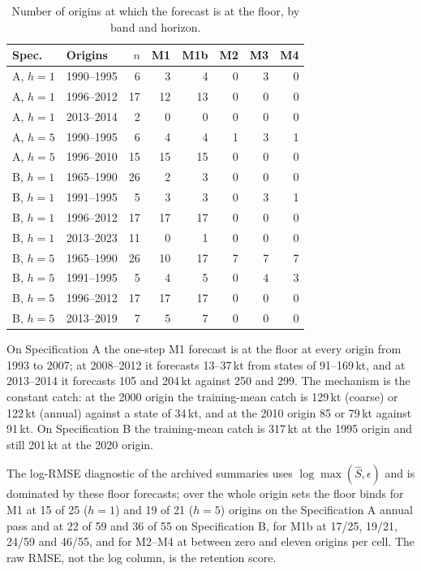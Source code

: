 \documentclass[preprint,11pt,authoryear]{elsarticle}
\theoremstyle{remark}
\begin{document}
\begin{table}[!htb]
\centering\footnotesize\setlength{\tabcolsep}{3.5pt}
\caption{Number of origins at which the forecast is at the floor, by band and horizon.}
\label{tab:si_floor}
\begin{tabular}{@{}llrrrrrr@{}}
\toprule
Spec. & Origins & $n$ & M1 & M1b & M2 & M3 & M4 \\
\midrule
A, $h=1$ & 1990--1995 & 6 & 3 & 4 & 0 & 3 & 0 \\
A, $h=1$ & 1996--2012 & 17 & 12 & 13 & 0 & 0 & 0 \\
A, $h=1$ & 2013--2014 & 2 & 0 & 0 & 0 & 0 & 0 \\
A, $h=5$ & 1990--1995 & 6 & 4 & 4 & 1 & 3 & 1 \\
A, $h=5$ & 1996--2010 & 15 & 15 & 15 & 0 & 0 & 0 \\
B, $h=1$ & 1965--1990 & 26 & 2 & 3 & 0 & 0 & 0 \\
B, $h=1$ & 1991--1995 & 5 & 3 & 3 & 0 & 3 & 1 \\
B, $h=1$ & 1996--2012 & 17 & 17 & 17 & 0 & 0 & 0 \\
B, $h=1$ & 2013--2023 & 11 & 0 & 1 & 0 & 0 & 0 \\
B, $h=5$ & 1965--1990 & 26 & 10 & 17 & 7 & 7 & 7 \\
B, $h=5$ & 1991--1995 & 5 & 4 & 5 & 0 & 4 & 3 \\
B, $h=5$ & 1996--2012 & 17 & 17 & 17 & 0 & 0 & 0 \\
B, $h=5$ & 2013--2019 & 7 & 5 & 7 & 0 & 0 & 0 \\
\bottomrule
\end{tabular}
\end{table}

On Specification A the one-step M1 forecast is at the floor at every origin from 1993 to 2007; at 2008--2012 it forecasts 13--37\,kt from states of 91--169\,kt, and at 2013--2014 it forecasts 105 and 204\,kt against 250 and 299. The mechanism is the constant catch: at the 2000 origin the training-mean catch is 129\,kt (coarse) or 122\,kt (annual) against a state of 34\,kt, and at the 2010 origin 85 or 79\,kt against 91\,kt. On Specification B the training-mean catch is 317\,kt at the 1995 origin and still 201\,kt at the 2020 origin.

The log-RMSE diagnostic of the archived summaries uses $\log\max(\hat S,\epsilon)$ and is dominated by these floor forecasts; over the whole origin sets the floor binds for M1 at 15 of 25 ($h=1$) and 19 of 21 ($h=5$) origins on the Specification A annual pass and at 22 of 59 and 36 of 55 on Specification B, for M1b at 17/25, 19/21, 24/59 and 46/55, and for M2--M4 at between zero and eleven origins per cell. The raw RMSE, not the log column, is the retention score.
\end{document}
